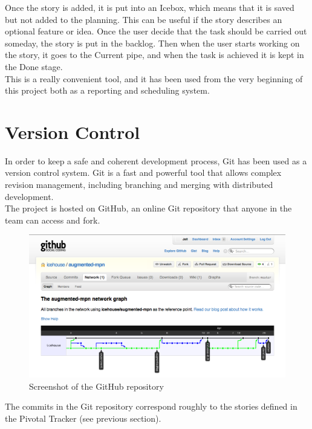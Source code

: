 Once the story is added, it is put into an Icebox, which means that it is saved but not added to the planning. This can be useful if the story describes an optional feature or idea. Once the user decide that the task should be carried out someday, the story is put in the backlog. Then when the user starts working on the story, it goes to the Current pipe, and when the task is achieved it is kept in the Done stage.\\

This is a really convenient tool, and it has been used from the very beginning of this project both as a reporting and scheduling system.

\section{Version Control}

In order to keep a safe and coherent development process, Git has been used as a version control system. Git is a fast and powerful tool that allows complex revision management, including branching and merging with distributed development.\\

The project is hosted on GitHub, an online Git repository that anyone in the team can access and fork.\\

\begin{figure}[ht]
\center
\includegraphics[scale=0.4]{pics/github}
\caption{Screenshot of the GitHub repository}
\label{fig:pivotal_tracker}
\end{figure}

The commits in the Git repository correspond roughly to the stories defined in the Pivotal Tracker (see previous section).